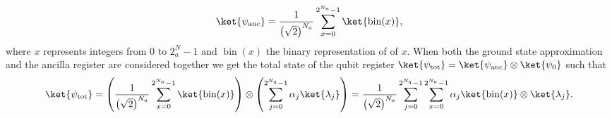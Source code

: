 \begin{itemize}
    \begin{equation}
        \ket{\psi_{\mathrm{anc}}} = \frac{1}{\left(\sqrt{2}\right)^{N_a}}\sum_{x=0}^{2^{N_a} - 1} \ket{\operatorname{bin}(x)},
    \end{equation} 
    where $x$ represents integers from 0 to $2^N_a - 1$ and $\operatorname{bin}(x)$ the binary representation of of $x$. When both the ground state approximation and the ancilla register are considered together we get the total state of the qubit register $\ket{\psi_{\mathrm{tot}}} = \ket{\psi_{\mathrm{anc}}}\otimes \ket{\psi_0}$ such that
    \begin{equation}
        \ket{\psi_{\mathrm{tot}}} = \left(\frac{1}{\left(\sqrt{2}\right)^{N_{a}}} \sum _{x=0}^{2^{N_{a}} -1}\ket{\operatorname{bin} (x)}\right) \otimes \left(\sum _{j=0}^{2^{N_{q}} -1} \alpha _{j}\ket{\lambda _{j}}\right) = \frac{1}{\left(\sqrt{2}\right)^{N_a}} \sum_{j=0}^{2^{N_q}-1} \sum_{x=0}^{2^{N_a} - 1} \alpha_j \ket{\operatorname{bin}(x)} \otimes \ket{\lambda_j}.
    \end{equation}    


\end{itemize}
